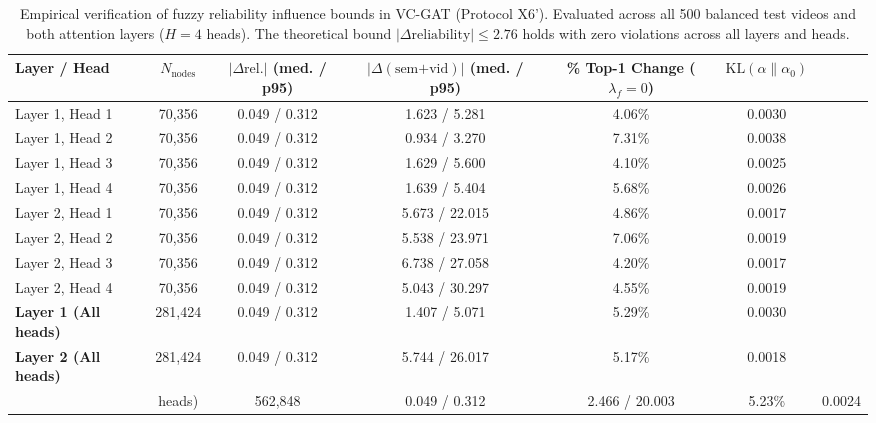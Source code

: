 \begin{table}[t]
\centering
\caption{Empirical verification of fuzzy reliability influence bounds in VC-GAT (Protocol X6'). Evaluated across all 500 balanced test videos and both attention layers ($H=4$ heads). The theoretical bound $|\Delta \text{reliability}| \le 2.76$ holds with zero violations across all layers and heads.}
\label{tab:x6_vcgat_influence}
\small
\begin{tabular}{lcccccc}
\toprule
Layer / Head & $N_{\text{nodes}}$ & $|\Delta \text{rel.}|$ (med. / p95) & $|\Delta (\text{sem+vid})|$ (med. / p95) & \% Top-1 Change ($\lambda_f=0$) & $\text{KL}(\alpha \parallel \alpha_0)$ \\
\midrule
Layer 1, Head 1 & 70,356 & 0.049 / 0.312 & 1.623 / 5.281 & 4.06\% & 0.0030 \\
Layer 1, Head 2 & 70,356 & 0.049 / 0.312 & 0.934 / 3.270 & 7.31\% & 0.0038 \\
Layer 1, Head 3 & 70,356 & 0.049 / 0.312 & 1.629 / 5.600 & 4.10\% & 0.0025 \\
Layer 1, Head 4 & 70,356 & 0.049 / 0.312 & 1.639 / 5.404 & 5.68\% & 0.0026 \\
Layer 2, Head 1 & 70,356 & 0.049 / 0.312 & 5.673 / 22.015 & 4.86\% & 0.0017 \\
Layer 2, Head 2 & 70,356 & 0.049 / 0.312 & 5.538 / 23.971 & 7.06\% & 0.0019 \\
Layer 2, Head 3 & 70,356 & 0.049 / 0.312 & 6.738 / 27.058 & 4.20\% & 0.0017 \\
Layer 2, Head 4 & 70,356 & 0.049 / 0.312 & 5.043 / 30.297 & 4.55\% & 0.0019 \\
\midrule
\textbf{Layer 1 (All heads)} & 281,424 & 0.049 / 0.312 & 1.407 / 5.071 & 5.29\% & 0.0030 \\
\midrule
\textbf{Layer 2 (All heads)} & 281,424 & 0.049 / 0.312 & 5.744 / 26.017 & 5.17\% & 0.0018 \\
\midrule
\textbf{Overall (All layers & heads)} & 562,848 & 0.049 / 0.312 & 2.466 / 20.003 & 5.23\% & 0.0024 \\
\bottomrule
\end{tabular}
\end{table}
